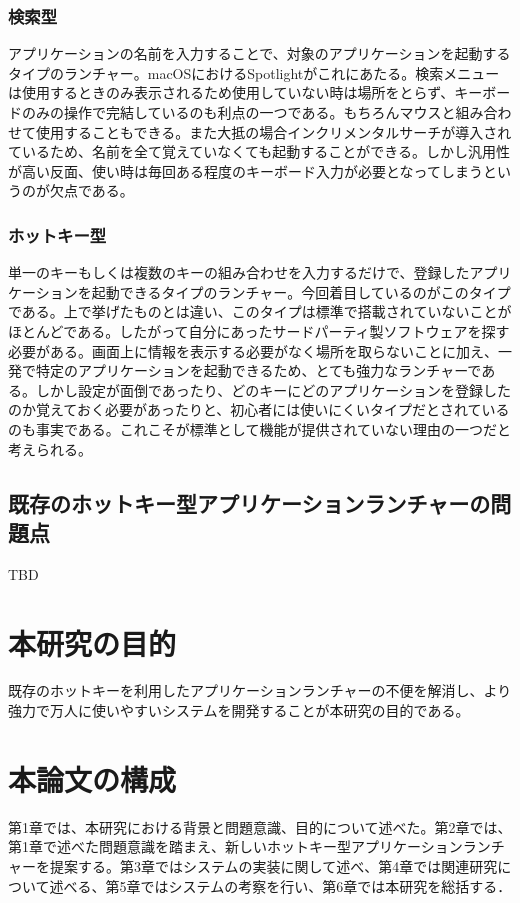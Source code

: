 \subsubsection{検索型}

アプリケーションの名前を入力することで、対象のアプリケーションを起動するタイプのランチャー。macOSにおけるSpotlightがこれにあたる。検索メニューは使用するときのみ表示されるため使用していない時は場所をとらず、キーボードのみの操作で完結しているのも利点の一つである。もちろんマウスと組み合わせて使用することもできる。また大抵の場合インクリメンタルサーチが導入されているため、名前を全て覚えていなくても起動することができる。しかし汎用性が高い反面、使い時は毎回ある程度のキーボード入力が必要となってしまうというのが欠点である。

\subsubsection{ホットキー型}

単一のキーもしくは複数のキーの組み合わせを入力するだけで、登録したアプリケーションを起動できるタイプのランチャー。今回着目しているのがこのタイプである。上で挙げたものとは違い、このタイプは標準で搭載されていないことがほとんどである。したがって自分にあったサードパーティ製ソフトウェアを探す必要がある。画面上に情報を表示する必要がなく場所を取らないことに加え、一発で特定のアプリケーションを起動できるため、とても強力なランチャーである。しかし設定が面倒であったり、どのキーにどのアプリケーションを登録したのか覚えておく必要があったりと、初心者には使いにくいタイプだとされているのも事実である。これこそが標準として機能が提供されていない理由の一つだと考えられる。

\subsection{既存のホットキー型アプリケーションランチャーの問題点}

TBD

\section{本研究の目的}

既存のホットキーを利用したアプリケーションランチャーの不便を解消し、より強力で万人に使いやすいシステムを開発することが本研究の目的である。

\section{本論文の構成}

第1章では、本研究における背景と問題意識、目的について述べた。第2章では、第1章で述べた問題意識を踏まえ、新しいホットキー型アプリケーションランチャーを提案する。第3章ではシステムの実装に関して述べ、第4章では関連研究について述べる、第5章ではシステムの考察を行い、第6章では本研究を総括する．